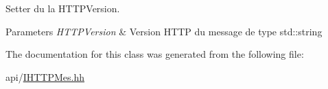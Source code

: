 Setter du la H\+T\+T\+P\+Version. 


\begin{DoxyParams}{Parameters}
{\em H\+T\+T\+P\+Version} & Version H\+T\+T\+P du message de type std\+::string \\
\hline
\end{DoxyParams}


The documentation for this class was generated from the following file\+:\begin{DoxyCompactItemize}
\item 
api/\hyperlink{_i_h_t_t_p_mes_8hh}{I\+H\+T\+T\+P\+Mes.\+hh}\end{DoxyCompactItemize}
